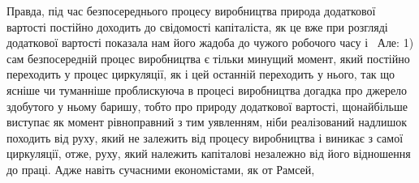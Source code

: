 Правда, під час безпосереднього процесу виробництва природа
додаткової вартості постійно доходить до свідомості капіталіста,
як це вже при розгляді додаткової вартості показала
нам його жадоба до чужого робочого часу і~ Але: 1) сам
безпосередній процес виробництва є тільки минущий момент,
який постійно переходить у процес циркуляції, як і цей останній
переходить у нього, так що ясніше чи туманніше проблискуюча
в процесі виробництва догадка про джерело здобутого у ньому
баришу, тобто про природу додаткової вартості, щонайбільше
виступає як момент рівноправний з тим уявленням, ніби реалізований
надлишок походить від руху, який не залежить від
процесу виробництва і виникає з самої циркуляції, отже, руху,
який належить капіталові незалежно від його відношення до
праці. Адже навіть сучасними економістами, як от Рамсей,
\parbreak{}  %
